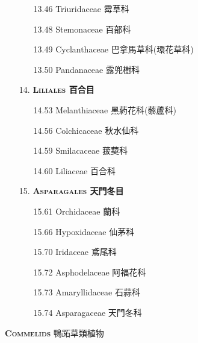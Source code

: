 \begin{enumerate}
\begin{enumerate}
      \item[13.46] Triuridaceae 霉草科  
        
      \item[13.48] Stemonaceae 百部科  
        
      \item[13.49] Cyclanthaceae 巴拿馬草科(環花草科)  
        
      \item[13.50] Pandanaceae 露兜樹科  
        
    \end{enumerate}
  \item[14. ] \textbf{\textsc{Liliales} 百合目} 
    \begin{enumerate}
      \item[14.53] Melanthiaceae 黑葯花科(藜蘆科)  
        
      \item[14.56] Colchicaceae 秋水仙科  
        
      \item[14.59] Smilacaceae 菝葜科  
        
      \item[14.60] Liliaceae 百合科  
        
    \end{enumerate}
  \item[15. ] \textbf{\textsc{Asparagales} 天門冬目} 
    \begin{enumerate}
      \item[15.61] Orchidaceae 蘭科  
        
      \item[15.66] Hypoxidaceae 仙茅科  
        
      \item[15.70] Iridaceae 鳶尾科  
        
      \item[15.72] Asphodelaceae 阿福花科  
        
      \item[15.73] Amaryllidaceae 石蒜科  
        
      \item[15.74] Asparagaceae 天門冬科  
        
    \end{enumerate}
\end{enumerate}
\vspace{2ex} 
\noindent \normalsize\textsc{\textbf{Commelids} 鴨跖草類植物}\selectfont \\
\footnotesize\selectfont
